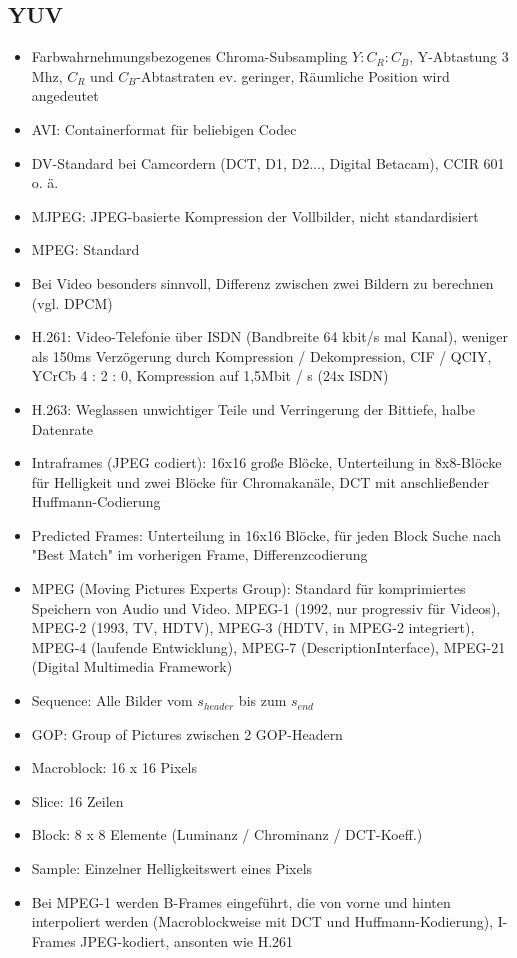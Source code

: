 \documentclass[12pt,landscape]{article}
\begin{document}
\begin{multicols}{3}
\subsection{YUV}
\begin{itemize}
\item Farbwahrnehmungsbezogenes Chroma-Subsampling $Y:C_R:C_B$, Y-Abtastung 3 Mhz, $C_R$ und $C_B$-Abtastraten ev. geringer, Räumliche Position wird angedeutet
\item AVI: Containerformat für beliebigen Codec
\item DV-Standard bei Camcordern (DCT, D1, D2..., Digital Betacam), CCIR 601 o. ä.
\item MJPEG: JPEG-basierte Kompression der Vollbilder, nicht standardisiert
\item MPEG: Standard
\item Bei Video besonders sinnvoll, Differenz zwischen zwei Bildern zu berechnen (vgl. DPCM)
\item H.261: Video-Telefonie über ISDN (Bandbreite 64 kbit/s mal Kanal), weniger als 150ms Verzögerung durch Kompression / Dekompression, CIF / QCIY, YCrCb 4 : 2 : 0, Kompression auf 1,5Mbit / s (24x ISDN)
\item H.263: Weglassen unwichtiger Teile und Verringerung der Bittiefe, halbe Datenrate
\item Intraframes (JPEG codiert): 16x16 große Blöcke, Unterteilung in 8x8-Blöcke für Helligkeit und zwei Blöcke für Chromakanäle, DCT mit anschließender Huffmann-Codierung
\item Predicted Frames: Unterteilung in 16x16 Blöcke, für jeden Block Suche nach "Best Match" im vorherigen Frame, Differenzcodierung
\item MPEG (Moving Pictures Experts Group): Standard für komprimiertes Speichern von Audio und Video. MPEG-1 (1992, nur progressiv für Videos), MPEG-2 (1993, TV, HDTV), MPEG-3 (HDTV, in MPEG-2 integriert), MPEG-4 (laufende Entwicklung), MPEG-7 (DescriptionInterface), MPEG-21 (Digital Multimedia Framework)
\item Sequence: Alle Bilder vom $s_{header}$ bis zum $s_{end}$
\item GOP: Group of Pictures zwischen 2 GOP-Headern
\item Macroblock: 16 x 16 Pixels
\item Slice: 16 Zeilen
\item Block: 8 x 8 Elemente (Luminanz / Chrominanz / DCT-Koeff.)
\item Sample: Einzelner Helligkeitswert eines Pixels
\item Bei MPEG-1 werden B-Frames eingeführt, die von vorne und hinten interpoliert werden (Macroblockweise mit DCT und Huffmann-Kodierung), I-Frames JPEG-kodiert, ansonten wie H.261

\end{itemize}
\end{multicols}
\end{document}
